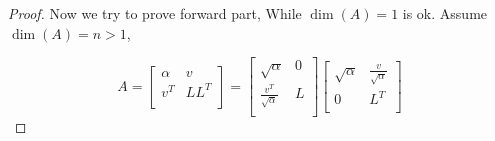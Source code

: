 \begin{proof}
Now we try to prove forward part, While $\dim(A) = 1$ is ok. Assume $\dim(A) = n > 1$,

\[
    A = 
    \begin{bmatrix}
        \alpha & v \\
        v^T    & LL^T \\
    \end{bmatrix}
    =
    \begin{bmatrix}
        \sqrt\alpha & 0 \\
        \frac{v^T}{\sqrt\alpha}    & L \\
    \end{bmatrix}
    \begin{bmatrix}
        \sqrt\alpha & \frac{v}{\sqrt\alpha} \\
        0           & L^T \\
    \end{bmatrix}
\]
  
\end{proof}
